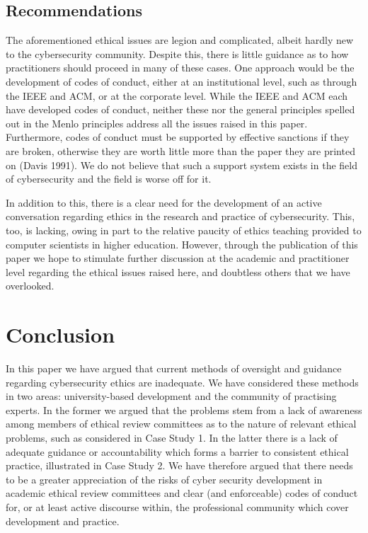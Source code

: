 \documentclass{svjour3}                     %
\begin{document}
\subsection{Recommendations}
\label{sec:recommendations}
The aforementioned ethical issues are legion and complicated, albeit hardly new to the cybersecurity community.  Despite this, there is little guidance as to how practitioners should proceed in many of these cases.  One approach would be the development of codes of conduct, either at an institutional level, such as through the IEEE and ACM, or at the corporate level. While the IEEE and ACM each have developed codes of conduct, neither these nor the general principles spelled out in the Menlo principles address all the issues raised in this paper.  Furthermore, codes of conduct must be supported by effective sanctions if they are broken, otherwise they are worth little more than the paper they are printed on (Davis 1991). We do not believe that such a support system exists in the field of cybersecurity and the field is worse off for it.

In addition to this, there is a clear need for the development of an active conversation regarding ethics in the research and practice of cybersecurity.  This, too, is lacking, owing in part to the relative paucity of ethics teaching provided to computer scientists in higher education.  However, through the publication of this paper we hope to stimulate further discussion at the academic and practitioner level regarding the ethical issues raised here, and doubtless others that we have overlooked.

\section{Conclusion}
\label{sec:conclusion}
In this paper we have argued that current methods of oversight and guidance regarding cybersecurity ethics are inadequate. We have considered these methods in two areas: university-based development and the community of practising experts. In the former we argued that the problems stem from a lack of awareness among members of ethical review committees as to the nature of relevant ethical problems, such as considered in Case Study 1. In the latter there is a lack of adequate guidance or accountability which forms a barrier to consistent ethical practice, illustrated in Case Study 2. We have therefore argued that there needs to be a greater appreciation of the risks of cyber security development in academic ethical review committees and clear (and enforceable) codes of conduct for, or at least active discourse within, the professional community which cover development and practice.
\end{document}
